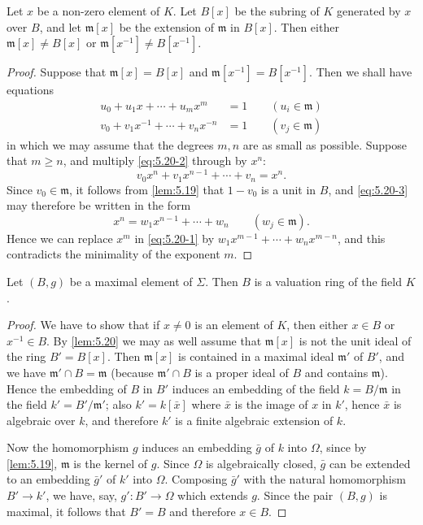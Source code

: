 \begin{lemma}\label{lem:5.20}
Let $x$ be a non-zero element of $K$. Let $B[x]$ be the subring of $K$ generated by $x$ over $B$, and let $\mathfrak{m}[x]$ be the extension of $\mathfrak{m}$ in $B[x]$. Then either $\mathfrak{m}[x] \neq B[x]$ or $\mathfrak{m}[x^{-1}] \neq B[x^{-1}]$.
\end{lemma}

\begin{proof}
Suppose that $\mathfrak{m}[x] = B[x]$ and $\mathfrak{m}[x^{-1}] = B[x^{-1}]$. Then we shall have equations
\begin{align}
u_0 + u_1 x + \cdots + u_m x^m &= 1 \qquad (u_i \in \mathfrak{m})  \tag{1}\label{eq:5.20-1} \\
v_0 + v_1 x^{-1} + \cdots + v_n x^{-n} &= 1 \qquad (v_j \in \mathfrak{m}) \tag{2} \label{eq:5.20-2}
\end{align}
in which we may assume that the degrees $m, n$ are as small as possible. Suppose that $m \geq n$, and multiply \eqref{eq:5.20-2} through by $x^n$:
\begin{equation}\label{eq:5.20-3}
v_0 x^n + v_1 x^{n-1} + \cdots + v_n = x^n. \tag{3}
\end{equation}
Since $v_0 \in \mathfrak{m}$, it follows from \eqref{lem:5.19} that $1 - v_0$ is a unit in $B$, and \eqref{eq:5.20-3} may therefore be written in the form
\[
x^n = w_1 x^{n-1} + \cdots + w_n \qquad (w_j \in \mathfrak{m}).
\]
Hence we can replace $x^m$ in \eqref{eq:5.20-1} by $w_1 x^{m-1} + \cdots + w_n x^{m-n}$, and this contradicts the minimality of the exponent $m$.
\end{proof}

\begin{theorem}\label{thm:5.21}
Let $(B, g)$ be a maximal element of $\Sigma$. Then $B$ is a valuation ring of the field $K$.
\end{theorem}

\begin{proof}
We have to show that if $x \neq 0$ is an element of $K$, then either $x \in B$ or $x^{-1} \in B$. By \eqref{lem:5.20} we may as well assume that $\mathfrak{m}[x]$ is not the unit ideal of the ring $B' = B[x]$. Then $\mathfrak{m}[x]$ is contained in a maximal ideal $\mathfrak{m}'$ of $B'$, and we have $\mathfrak{m}' \cap B = \mathfrak{m}$ (because $\mathfrak{m}' \cap B$ is a proper ideal of $B$ and contains $\mathfrak{m}$). Hence the embedding of $B$ in $B'$ induces an embedding of the field $k = B/\mathfrak{m}$ in the field $k' = B'/\mathfrak{m}'$; also $k' = k[\bar{x}]$ where $\bar{x}$ is the image of $x$ in $k'$, hence $\bar{x}$ is algebraic over $k$, and therefore $k'$ is a finite algebraic extension of $k$.

Now the homomorphism $g$ induces an embedding $\bar{g}$ of $k$ into $\Omega$, since by \eqref{lem:5.19}, $\mathfrak{m}$ is the kernel of $g$. Since $\Omega$ is algebraically closed, $\bar{g}$ can be extended to an embedding $\bar{g}'$ of $k'$ into $\Omega$. Composing $\bar{g}'$ with the natural homomorphism $B' \to k'$, we have, say, $g' \colon B' \to \Omega$ which extends $g$. Since the pair $(B, g)$ is maximal, it follows that $B' = B$ and therefore $x \in B$.
\end{proof}

